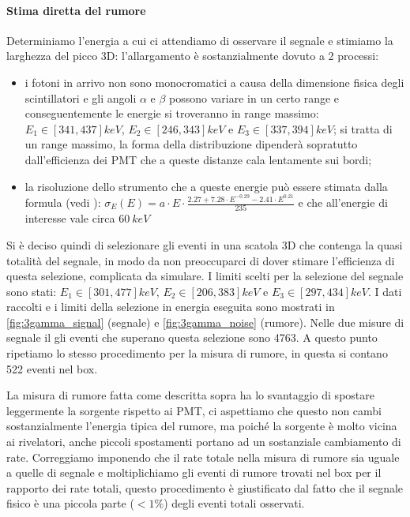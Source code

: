 \paragraph{Stima diretta del rumore}
Determiniamo l'energia a cui ci attendiamo di osservare il segnale e stimiamo la larghezza del picco 3D: l'allargamento è sostanzialmente dovuto a 2 processi:
\begin{itemize}
	\item i fotoni in arrivo non sono monocromatici a causa della dimensione fisica degli scintillatori e gli angoli $\alpha$ e $\beta$ possono variare in un certo range e conseguentemente le energie si troveranno in range massimo:  $E_1 \in [341,437]\si{keV}$, $E_2 \in [246,343]\si{keV}$ e $E_3 \in [337,394]\si{keV}$; si tratta di un range massimo, la forma della distribuzione dipenderà sopratutto dall'efficienza dei PMT che a queste distanze cala lentamente sui bordi;
	\item la risoluzione dello strumento che a queste energie può essere stimata dalla formula (vedi \cite{6}):
	$\sigma_E(E) = a \cdot E \cdot \frac{2.27 + 7.28 \cdot E ^ {-0.29} - 2.41 \cdot E ^ {0.21}} {235}$ e che all'energie di interesse vale circa $\SI{60}{keV}$
\end{itemize}
Si è deciso quindi di selezionare gli eventi in una scatola 3D che contenga la quasi totalità del segnale, in modo da non preoccuparci di dover stimare l'efficienza di questa selezione, complicata da simulare. 
I limiti scelti per la selezione del segnale sono stati: $E_1 \in [301,477]\si{keV}$, $E_2 \in [206,383]\si{keV}$ e $E_3 \in [297,434]\si{keV}$.
I dati raccolti e i limiti della selezione in energia eseguita sono mostrati in \autoref{fig:3gamma_signal} (segnale) e \autoref{fig:3gamma_noise} (rumore).
Nelle due misure di segnale il gli eventi che superano questa selezione sono 4763. 
A questo punto ripetiamo lo stesso procedimento per la misura di rumore, in questa si contano 522 eventi nel box.

La misura di rumore fatta come descritta sopra ha lo svantaggio di spostare leggermente la sorgente rispetto ai PMT, ci aspettiamo che questo non cambi sostanzialmente l'energia tipica del rumore, ma poiché la sorgente è molto vicina ai rivelatori, anche piccoli spostamenti portano ad un sostanziale cambiamento di rate. Correggiamo imponendo che il rate totale nella misura di rumore sia uguale a quelle di segnale e moltiplichiamo gli eventi di rumore trovati nel box per il rapporto dei rate totali, questo procedimento è giustificato dal fatto che il segnale fisico è una piccola parte ($< 1\%$) degli eventi totali osservati.

